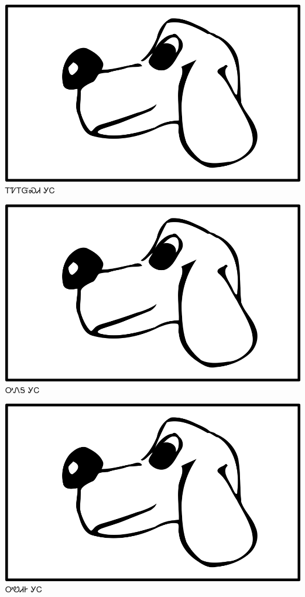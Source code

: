 \documentclass[avery5371]{flashcards}%
\begin{document}
\begin{flashcard}{
\includegraphics[width=0.95\columnwidth,height=.51\columnwidth,keepaspectratio]{../artwork/for-colors/gihli}
}
\Huge ᎢᏤᎢᏳᏍᏗ ᎩᏟ
\end{flashcard}

\begin{flashcard}{
\includegraphics[width=0.95\columnwidth,height=.51\columnwidth,keepaspectratio]{../artwork/for-colors/gihli}
}
\Huge ᎤᏁᎦ ᎩᏟ
\end{flashcard}

\begin{flashcard}{
\includegraphics[width=0.95\columnwidth,height=.51\columnwidth,keepaspectratio]{../artwork/for-colors/gihli}
}
\Huge ᎤᏬᏗᎨ ᎩᏟ
\end{flashcard}
\end{document}
